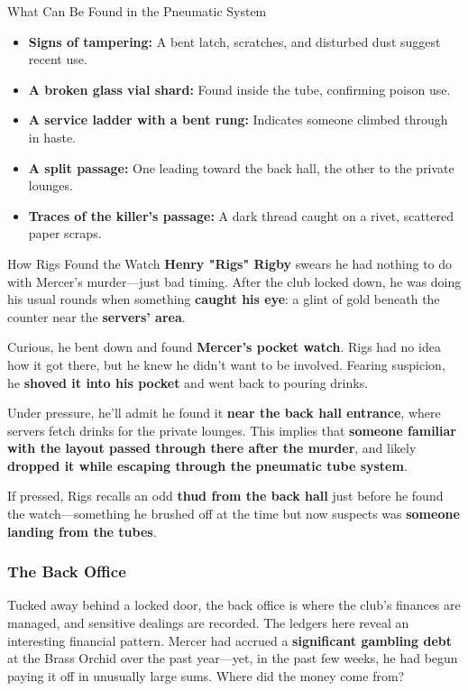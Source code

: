 \begin{CommentBox}{What Can Be Found in the Pneumatic System}  
	\begin{itemize}
		\item \textbf{Signs of tampering:} A bent latch, scratches, and disturbed dust suggest recent use.
		\item \textbf{A broken glass vial shard:} Found inside the tube, confirming poison use.
		\item \textbf{A service ladder with a bent rung:} Indicates someone climbed through in haste.
		\item \textbf{A split passage:} One leading toward the back hall, the other to the private lounges.
		\item \textbf{Traces of the killer’s passage:} A dark thread caught on a rivet, scattered paper scraps.
	\end{itemize}
\end{CommentBox}


\begin{Example}{How Rigs Found the Watch}
	\textbf{Henry "Rigs" Rigby} swears he had nothing to do with Mercer’s murder—just bad timing. After the club locked down, he was doing his usual rounds when something \textbf{caught his eye}: a glint of gold beneath the counter near the \textbf{servers’ area}.

	Curious, he bent down and found \textbf{Mercer’s pocket watch}. Rigs had no idea how it got there, but he knew he didn’t want to be involved. Fearing suspicion, he \textbf{shoved it into his pocket} and went back to pouring drinks.
	
	Under pressure, he’ll admit he found it \textbf{near the back hall entrance}, where servers fetch drinks for the private lounges. This implies that \textbf{someone familiar with the layout passed through there after the murder}, and likely \textbf{dropped it while escaping through the pneumatic tube system}.
	
	If pressed, Rigs recalls an odd \textbf{thud from the back hall} just before he found the watch—something he brushed off at the time but now suspects was \textbf{someone landing from the tubes}.
\end{Example}  

\newcolumn

\subsubsection{The Back Office}  
Tucked away behind a locked door, the back office is where the club’s finances are managed, and sensitive dealings are recorded. The ledgers here reveal an interesting financial pattern. Mercer had accrued a \textbf{significant gambling debt} at the Brass Orchid over the past year—yet, in the past few weeks, he had begun paying it off in unusually large sums. Where did the money come from?  

